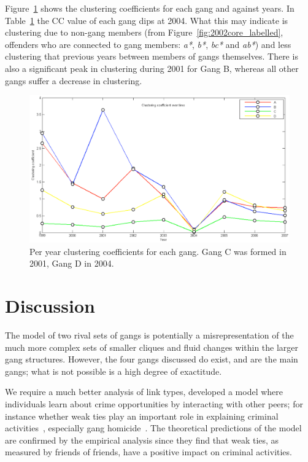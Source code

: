 \documentclass[conference]{IEEEtran}
\theoremstyle{definition}
\begin{document}
Figure~\ref{fig:gangscc1years} shows the clustering
coefficients for each gang and against years. In Table~\ref{fig:gangscc1years} the
CC value of each gang dips at 2004. What this may indicate is
clustering due to non-gang members (from
Figure~\ref{fig:2002core_labelled}, offenders who are connected to
gang members: \emph{a*}, \emph{b*}, \emph{bc*} and \emph{ab*}) and
less clustering that previous years between members of gangs
themselves. There is also a significant peak in clustering during 2001
for Gang B, whereas all other gangs suffer a decrease in clustering.



\begin{figure}[htb]
\centering
\includegraphics[width=\columnwidth]{images/gangscc1years}
\caption{Per year clustering coefficients for each gang. Gang C was formed in 2001, Gang D in 2004.} 
\label{fig:gangscc1years}
\end{figure}


\section{Discussion}\label{sec:discussion}
The model of two rival sets of gangs is potentially a
misrepresentation of the much more complex sets of smaller cliques and
fluid changes within the larger gang structures. However, the four
gangs discussed do exist, and are the main gangs; what is not possible
is a high degree of exactitude.


We require a much better analysis of link types, developed a model
where individuals learn about crime opportunities by interacting with
other peers; for instance whether weak ties play an important role in
explaining criminal activities~\cite{PatacchiniZenou2008}, especially
gang homicide~\cite{papachristos:2009}. The theoretical predictions of
the model are confirmed by the empirical analysis since they find that
weak ties, as measured by friends of friends, have a positive impact
on criminal activities.
\end{document}
